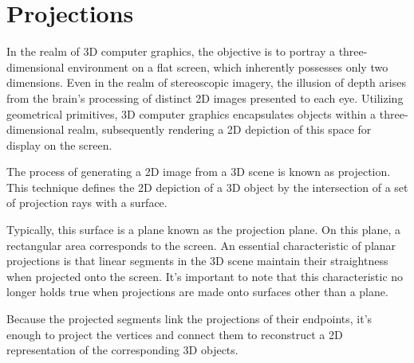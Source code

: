 \section{Projections}

In the realm of 3D computer graphics, the objective is to portray a three-dimensional environment on a flat screen, which inherently possesses only two dimensions. 
Even in the realm of stereoscopic imagery, the illusion of depth arises from the brain's processing of distinct 2D images presented to each eye. 
Utilizing geometrical primitives, 3D computer graphics encapsulates objects within a three-dimensional realm, subsequently rendering a 2D depiction of this space for display on the screen.

The process of generating a 2D image from a 3D scene is known as projection. 
This technique defines the 2D depiction of a 3D object by the intersection of a set of projection rays with a surface.

Typically, this surface is a plane known as the projection plane. On this plane, a rectangular area corresponds to the screen.
An essential characteristic of planar projections is that linear segments in the 3D scene maintain their straightness when projected onto the screen.
It's important to note that this characteristic no longer holds true when projections are made onto surfaces other than a plane.

Because the projected segments link the projections of their endpoints, it's enough to project the vertices and connect them to reconstruct a 2D representation of the corresponding 3D objects.

